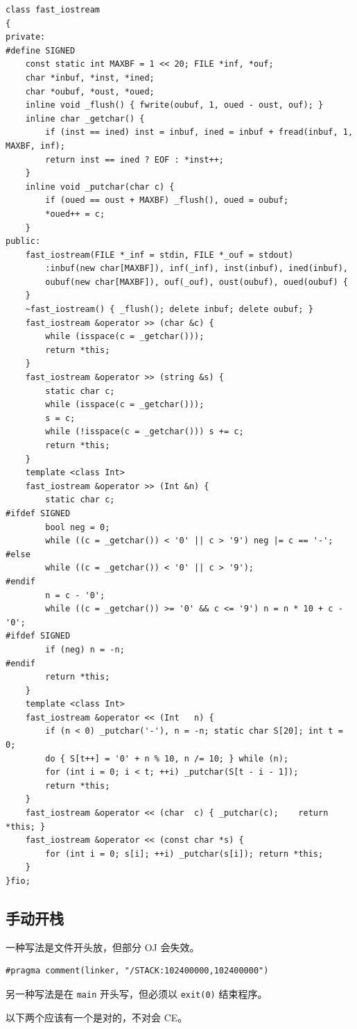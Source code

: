 \documentclass[12pt]{ctexart}
\begin{document}
\begin{lstlisting}
class fast_iostream
{
private:
#define SIGNED
	const static int MAXBF = 1 << 20; FILE *inf, *ouf;
	char *inbuf, *inst, *ined;
	char *oubuf, *oust, *oued;
	inline void _flush() { fwrite(oubuf, 1, oued - oust, ouf); }
	inline char _getchar() {
		if (inst == ined) inst = inbuf, ined = inbuf + fread(inbuf, 1, MAXBF, inf);
		return inst == ined ? EOF : *inst++;
	}
	inline void _putchar(char c) {
		if (oued == oust + MAXBF) _flush(), oued = oubuf;
		*oued++ = c;
	}
public:
	fast_iostream(FILE *_inf = stdin, FILE *_ouf = stdout)
		:inbuf(new char[MAXBF]), inf(_inf), inst(inbuf), ined(inbuf),
		oubuf(new char[MAXBF]), ouf(_ouf), oust(oubuf), oued(oubuf) {
	}
	~fast_iostream() { _flush(); delete inbuf; delete oubuf; }
	fast_iostream &operator >> (char &c) {
		while (isspace(c = _getchar()));
		return *this;
	}
	fast_iostream &operator >> (string &s) {
		static char c;
		while (isspace(c = _getchar()));
		s = c;
		while (!isspace(c = _getchar())) s += c;
		return *this;
	}
	template <class Int>
	fast_iostream &operator >> (Int &n) {
		static char c;
#ifdef SIGNED
		bool neg = 0;
		while ((c = _getchar()) < '0' || c > '9') neg |= c == '-';
#else
		while ((c = _getchar()) < '0' || c > '9');
#endif
		n = c - '0';
		while ((c = _getchar()) >= '0' && c <= '9') n = n * 10 + c - '0';
#ifdef SIGNED
		if (neg) n = -n;
#endif
		return *this;
	}
	template <class Int>
	fast_iostream &operator << (Int   n) {
		if (n < 0) _putchar('-'), n = -n; static char S[20]; int t = 0;
		do { S[t++] = '0' + n % 10, n /= 10; } while (n);
		for (int i = 0; i < t; ++i) _putchar(S[t - i - 1]);
		return *this;
	}
	fast_iostream &operator << (char  c) { _putchar(c);    return *this; }
	fast_iostream &operator << (const char *s) {
		for (int i = 0; s[i]; ++i) _putchar(s[i]); return *this;
	}
}fio;
\end{lstlisting}
\subsection{手动开栈}

一种写法是文件开头放，但部分 OJ 会失效。

\begin{lstlisting}
#pragma comment(linker, "/STACK:102400000,102400000")
\end{lstlisting}

另一种写法是在 \verb|main| 开头写，但必须以 \verb|exit(0)| 结束程序。

以下两个应该有一个是对的，不对会 CE。
\end{document}
